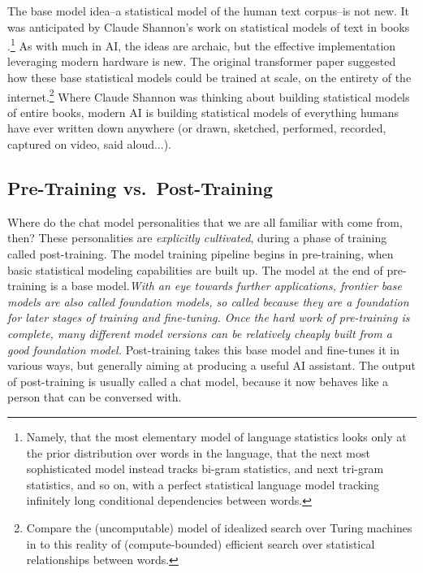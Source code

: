 The base model idea--a statistical model of the human text corpus--is not new.
It was anticipated by Claude Shannon's work on statistical models of text in
books \cite{shannon1951english}.\footnote{Namely, that the most elementary
model of language statistics looks only at the prior distribution over words in
the language, that the next most sophisticated model instead tracks bi-gram
statistics, and next tri-gram statistics, and so on, with a perfect statistical
language model tracking infinitely long conditional dependencies between
words.} As with much in AI, the ideas are archaic, but the effective
implementation leveraging modern hardware is new. The original transformer
paper suggested how these base statistical models could be trained at scale, on
the entirety of the internet.\footnote{Compare the (uncomputable) model of
idealized search over Turing machines in \cite{hutter2000aixi} to this reality
of (compute-bounded) efficient search over statistical relationships between
words.} Where Claude Shannon was thinking about building statistical models of
entire books, modern AI is building statistical models of everything humans
have ever written down anywhere (or drawn, sketched, performed, recorded,
captured on video, said aloud...).

\subsection{Pre-Training vs.\ Post-Training}
Where do the chat model personalities that we are all familiar with come from,
then? These personalities are \emph{explicitly cultivated}, during a phase of
training called post-training. The model training pipeline begins in
pre-training, when basic statistical modeling capabilities are built up. The
model at the end of pre-training is a base model.\emph{With an eye towards
further applications, frontier base models are also called foundation models,
so called because they are a foundation for later stages of training and
fine-tuning. Once the hard work of pre-training is complete, many different
model versions can be relatively cheaply built from a good foundation model.}
Post-training takes this base model and fine-tunes it in various ways, but
generally aiming at producing a useful AI assistant. The output of
post-training is usually called a chat model, because it now behaves like a
person that can be conversed with.


